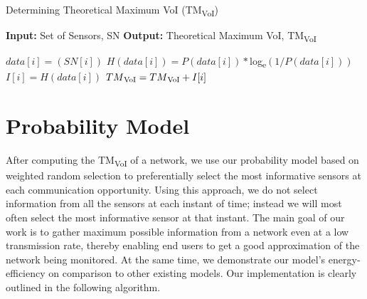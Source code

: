 \begin{algorithm}
	\caption{Determining Theoretical Maximum VoI (TM\textsubscript {VoI})}
        \label{tmvoi}
	\textbf{Input:} Set of Sensors, SN \newline
	\textbf{Output:} Theoretical Maximum VoI, TM\textsubscript {VoI}
	 
	\begin{algorithmic}[1]
	\State $data[i] = (SN[i])$
	\State $H (data[i]) =  P(data[i]) * $log\textsubscript{e}$ (1/P(data[i]))$
        \State $I[i] = H(data[i])$
        \State $TM\textsubscript {VoI} = TM\textsubscript {VoI} + I[i]$
        \EndFor %
	\end{algorithmic}
\end{algorithm}


\section{Probability Model}
After computing the TM\textsubscript {VoI} of a network, we use our
probability model based on weighted random selection to preferentially
select the most informative sensors at each communication
opportunity. Using this approach, we do not select information from
all the sensors at each instant of time; instead we will most often
select the most informative sensor at that instant. The main goal of
our work is to gather maximum possible information from a network even
at a low transmission rate, thereby enabling end users to get a good
approximation of the network being monitored.  At the same time, we
demonstrate our model's energy-efficiency on comparison to other
existing models. Our implementation is clearly outlined in the
following algorithm.

